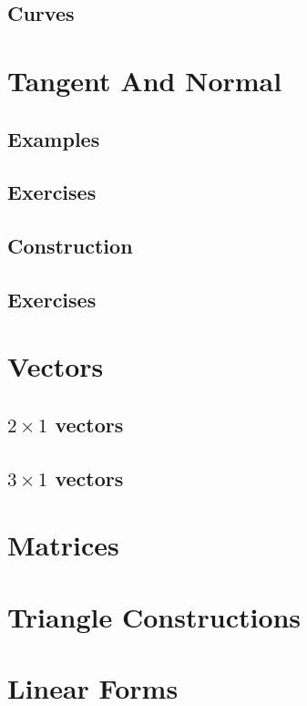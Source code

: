 \documentclass[journal,12pt,onecolumn]{IEEEtran}
\begin{document}
\subsection{Curves}

%
\section{Tangent And Normal}
\subsection{Examples}

\subsection{Exercises}

\subsection{Construction}

\subsection{Exercises}



% 
\appendices
\section{ Vectors}
\subsection{$2\times 1$ vectors}

%
\subsection{$3\times 1$ vectors}

\section{Matrices}



\section{Triangle Constructions}



\section{Linear Forms}
\end{document}
